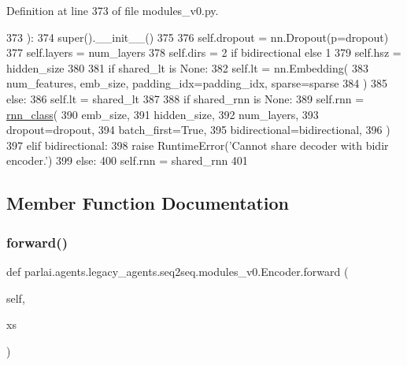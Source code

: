 Definition at line 373 of file modules\+\_\+v0.\+py.


\begin{DoxyCode}
373     ):
374         super().\_\_init\_\_()
375 
376         self.dropout = nn.Dropout(p=dropout)
377         self.layers = num\_layers
378         self.dirs = 2 \textcolor{keywordflow}{if} bidirectional \textcolor{keywordflow}{else} 1
379         self.hsz = hidden\_size
380 
381         \textcolor{keywordflow}{if} shared\_lt \textcolor{keywordflow}{is} \textcolor{keywordtype}{None}:
382             self.lt = nn.Embedding(
383                 num\_features, emb\_size, padding\_idx=padding\_idx, sparse=sparse
384             )
385         \textcolor{keywordflow}{else}:
386             self.lt = shared\_lt
387 
388         \textcolor{keywordflow}{if} shared\_rnn \textcolor{keywordflow}{is} \textcolor{keywordtype}{None}:
389             self.rnn = \hyperlink{namespaceseq2seq_1_1train_a1b062073c766f1d34a67f572ef256ba0}{rnn\_class}(
390                 emb\_size,
391                 hidden\_size,
392                 num\_layers,
393                 dropout=dropout,
394                 batch\_first=\textcolor{keyword}{True},
395                 bidirectional=bidirectional,
396             )
397         \textcolor{keywordflow}{elif} bidirectional:
398             \textcolor{keywordflow}{raise} RuntimeError(\textcolor{stringliteral}{'Cannot share decoder with bidir encoder.'})
399         \textcolor{keywordflow}{else}:
400             self.rnn = shared\_rnn
401 
\end{DoxyCode}


\subsection{Member Function Documentation}
\mbox{\label{classparlai_1_1agents_1_1legacy__agents_1_1seq2seq_1_1modules__v0_1_1Encoder_a53c7f1b88916692c14fa744077b3bd77}} 
\subsubsection{\texorpdfstring{forward()}{forward()}}
{\footnotesize\ttfamily def parlai.\+agents.\+legacy\+\_\+agents.\+seq2seq.\+modules\+\_\+v0.\+Encoder.\+forward (\begin{DoxyParamCaption}\item[{}]{self,  }\item[{}]{xs }\end{DoxyParamCaption})}




